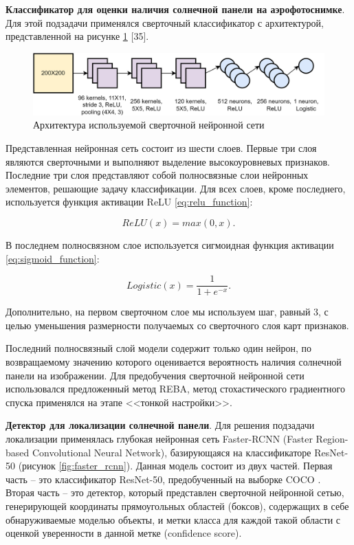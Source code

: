\textbf{Классификатор для оценки наличия солнечной панели на аэрофотоснимке}. Для этой подзадачи применялся сверточный классификатор с архитектурой, представленной на рисунке \ref{fig:used_cnn} [35]. 

\begin{figure}[ht]
	\centering
	\includegraphics[width=17cm]{man-source/images/ch4/pic4-19.png}
	\caption{Архитектура используемой сверточной нейронной сети}
	\label{fig:used_cnn}
\end{figure}

Представленная нейронная сеть состоит из шести слоев. Первые три слоя являются сверточными и выполняют выделение высокоуровневых признаков. Последние три слоя представляют собой полносвязные слои нейронных элементов, решающие задачу классификации. Для всех слоев, кроме последнего, используется функция активации ReLU \ref{eq:relu_function}:

\begin{equation}
    \label{eq:relu_function}
    ReLU(x) = max(0, x).
\end{equation}

В последнем полносвязном слое используется сигмоидная функция активации \ref{eq:sigmoid_function}:

\begin{equation}
    \label{eq:sigmoid_function}
    Logistic(x) = \frac{1}{1+e^{-x}}.
\end{equation}

Дополнительно, на первом сверточном слое мы используем шаг, равный 3, с целью уменьшения размерности получаемых со сверточного слоя карт признаков.

Последний полносвязный слой модели содержит только один нейрон, по возвращаемому значению которого оценивается вероятность наличия солнечной панели на изображении. Для предобучения сверточной нейронной сети использовался предложенный метод REBA, метод стохастического градиентного спуска применялся на этапе <<тонкой настройки>>. 

\textbf{Детектор для локализации солнечной панели}. Для решения подзадачи локализации применялась глубокая нейронная сеть Faster-RCNN (Faster Region-based Convolutional Neural Network), базирующаяся на классификаторе ResNet-50 (рисунок \ref{fig:faster_rcnn}). Данная модель состоит из двух частей. Первая часть -- это классификатор ResNet-50, предобученный на выборке COCO \cite{lin2015}. Вторая часть -- это детектор, который представлен сверточной нейронной сетью, генерирующей координаты прямоугольных областей (боксов), содержащих в себе обнаруживаемые моделью объекты, и метки класса для каждой такой области с оценкой уверенности в данной метке (confidence score).


